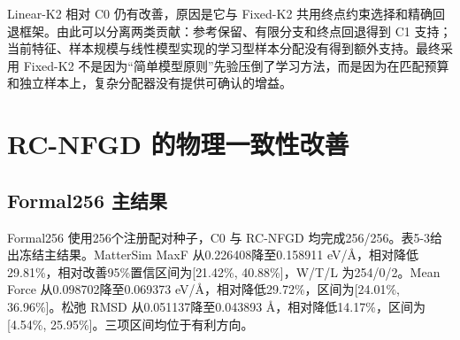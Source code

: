 Linear-K2 相对 C0 仍有改善，原因是它与 Fixed-K2 共用终点约束选择和精确回退框架。由此可以分离两类贡献：参考保留、有限分支和终点回退得到 C1 支持；当前特征、样本规模与线性模型实现的学习型样本分配没有得到额外支持。最终采用 Fixed-K2 不是因为``简单模型原则''先验压倒了学习方法，而是因为在匹配预算和独立样本上，复杂分配器没有提供可确认的增益。

\section{RC-NFGD 的物理一致性改善}

\subsection{Formal256 主结果}

Formal256 使用256个注册配对种子，C0 与 RC-NFGD 均完成256/256。表5-3给出冻结主结果。Matter\allowbreak Sim MaxF 从0.226408降至0.158911 eV/Å，相对降低29.81\%，相对改善95\%置信区间为{[}21.42\%, 40.88\%{]}，W/T/L 为254/0/2。Mean Force 从0.098702降至0.069373 eV/Å，相对降低29.72\%，区间为{[}24.01\%, 36.96\%{]}。松弛 RMSD 从0.051137降至0.043893 Å，相对降低14.17\%，区间为{[}4.54\%, 25.95\%{]}。三项区间均位于有利方向。


